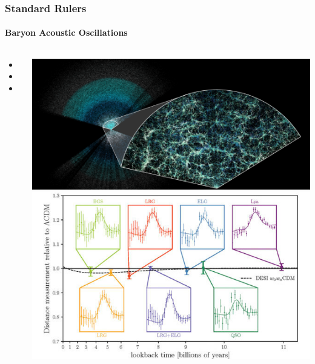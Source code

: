 \documentclass[aspectratio=169]{beamer}
\begin{document}
\begin{frame}
    \frametitle{Standard Rulers}
    \framesubtitle{Baryon Acoustic Oscillations}
    \begin{columns}
        \begin{itemize}
            \item <+Explanation+>
            \item <+SDSS+>
            \item <+DESI+>
        \end{itemize}
        \includegraphics[width=\textwidth]{figures/desi_galaxies.png}
        \includegraphics[width=\textwidth]{figures/desi_bao.jpg}%
    \end{columns}
\end{frame}
\end{document}

